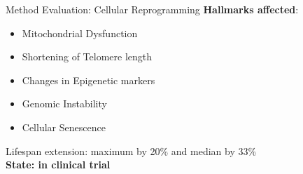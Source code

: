 % 
% 
% 


\begin{frame}[c]{Method Evaluation: Cellular Reprogramming}
    \large
    \textbf{Hallmarks affected}: \\
    \begin{itemize}[<(1)->]
        \item Mitochondrial Dysfunction
        \item Shortening of Telomere length
        \item Changes in Epigenetic markers
        \item Genomic Instability
        \item Cellular Senescence
    \end{itemize}
    \pause
    Lifespan extension: maximum by 20\% and median by 33\% \cite{ocampo2016vivo} \\
    \pause
    \textbf{State: in clinical trial}
\end{frame}



